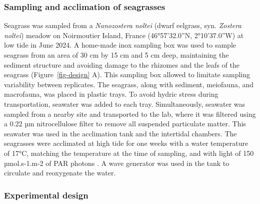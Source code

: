 \documentclass[
  number]{elsarticle}
\begin{document}
\subsubsection{Sampling and acclimation of
seagrasses}\label{sampling-and-acclimation-of-seagrasses}

Seagrass was sampled from a \emph{Nanozostera noltei} (dwarf eelgrass,
syn. \emph{Zostera noltei}) meadow on Noirmoutier Island, France
(46°57'32.0''N, 2°10'37.0''W) at low tide in June 2024. A home-made inox
sampling box was used to sample seagrass from an area of 30 cm by 15 cm
and 5 cm deep, maintaining the sediment structure and avoiding damage to
the rhizomes and the leafs of the seagrass (Figure~\ref{fig-design} A).
This sampling box allowed to limitate sampling variability between
replicates. The seagrass, along with sediment, meiofauna, and
macrofauna, was placed in plastic trays. To avoid hydric stress during
transportation, seawater was added to each tray. Simultaneously,
seawater was sampled from a nearby site and transported to the lab,
where it was filtered using a 0.22 µm nitrocellulose filter to remove
all suspended particulate matter. This seawater was used in the
acclimation tank and the intertidal chambers. The seagrasses were
acclimated at high tide for one weeks with a water temperature of 17°C,
matching the temperature at the time of sampling, and with light of 150
µmol.s-1.m-2 of PAR photons \citep{akbar2020mangrove}. A wave generator
was used in the tank to circulate and reoxygenate the water.

\subsubsection{Experimental design}\label{experimental-design}
\end{document}
